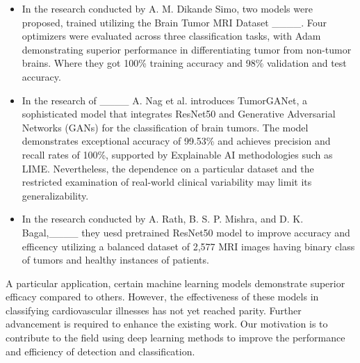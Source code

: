 \begin{itemize}
\item In the research conducted by A. M. Dikande Simo, two models were proposed, trained utilizing the Brain Tumor MRI Dataset ____. Four optimizers were evaluated across three classification tasks, with Adam demonstrating superior performance in differentiating tumor from non-tumor brains.
Where they got 100\% training accuracy and 98\% validation and test accuracy.

\item In the research of ____ A. Nag et al. introduces TumorGANet, a sophisticated model that integrates ResNet50 and Generative Adversarial Networks (GANs) for the classification of brain tumors. The model demonstrates exceptional accuracy of 99.53\% and achieves precision and recall rates of 100\%, supported by Explainable AI methodologies such as LIME. Nevertheless, the dependence on a particular dataset and the restricted examination of real-world clinical variability may limit its generalizability.

\item In the research conducted by  A. Rath, B. S. P. Mishra, and D. K. Bagal,____ they uesd pretrained ResNet50 model to improve  accuracy and efficency utilizing a balanced dataset of 2,577 MRI images having binary class of tumors and healthy instances of patients.

\end{itemize}
A particular application, certain machine learning models demonstrate superior efficacy compared to others. However, the effectiveness of these models in classifying cardiovascular illnesses has not yet reached parity. Further advancement is required to enhance the existing work. Our motivation is to contribute to the field using deep learning methods to improve the performance and efficiency of detection and classification.